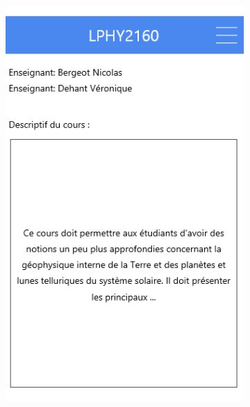 \documentclass{eplmastersthesis}
\begin{document}
\begin{figure}[H]
\begin{subfigure}[b]{0.3\textwidth}
        \includegraphics[width=\textwidth]{Images/InVision/detail-cours.png}
    \end{subfigure}
    ~ %
    \begin{subfigure}[b]{0.3\textwidth}

\end{subfigure}
\end{figure}
\end{document}
